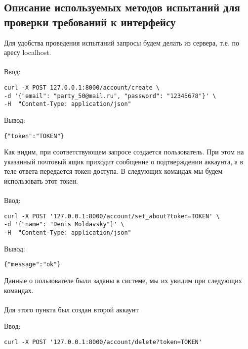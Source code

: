 \documentclass[testmethods]{espd}
\begin{document}
\subsection{Описание используемых методов испытаний для проверки требований к интерфейсу}
Для удобства проведения испытаний запросы будем делать из сервера, т.е. по аресу localhost.

\paragraph{} %
Ввод:

\begin{verbatim}
curl -X POST 127.0.0.1:8000/account/create \
-d '{"email": "party_50@mail.ru", "password": "12345678"}' \
-H  "Content-Type: application/json"
\end{verbatim}

Вывод:

\begin{verbatim}
{"token":"TOKEN"}
\end{verbatim}

Как видим, при соответствующем запросе создается пользователь. При этом на указанный почтовый ящик приходит сообщение о подтверждении аккаунта, а в теле ответа передается токен доступа. В следующих командах мы будем использовать этот токен.

\paragraph{} %
Ввод:

\begin{verbatim}
curl -X POST '127.0.0.1:8000/account/set_about?token=TOKEN' \
-d '{"name": "Denis Moldavsky"}' \
-H  "Content-Type: application/json"
\end{verbatim}

Вывод:

\begin{verbatim}
{"message":"ok"}
\end{verbatim}

Данные о пользователе были заданы в системе, мы их увидим при следующих командах.

\paragraph{} %
Для этого пункта был создан второй аккаунт

Ввод:

\begin{verbatim}
curl -X POST '127.0.0.1:8000/account/delete?token=TOKEN'
\end{verbatim}
\end{document}
